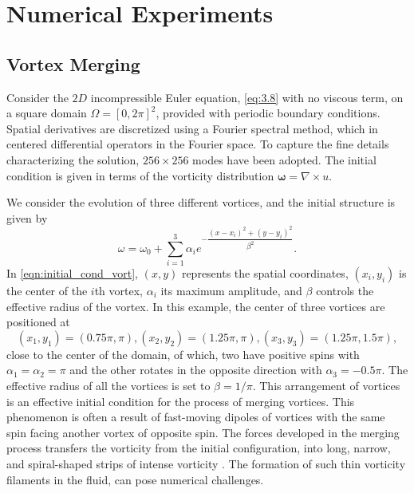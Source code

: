 

\section{Numerical Experiments} \label{sec:res}

\subsection{Vortex Merging}
Consider the $2D$ incompressible Euler equation, \eqref{eq:3.8} with no viscous term, on a square domain $\Omega = [0,2\pi]^2$, provided with periodic boundary conditions. Spatial derivatives are discretized using a Fourier spectral method, which in centered differential operators in the Fourier space. To capture the fine details characterizing the solution, $256\times 256$ modes have been adopted. The initial condition is given in terms of the vorticity distribution $\mathbf{\omega} = \nabla \times u$. 

We consider the evolution of three different vortices, and the initial structure is given by
\begin{equation}\label{eqn:initial_cond_vort}
\omega = \omega_0 + \sum_{i=1}^{3} \alpha_i e^{-\dfrac{\left(x-x_i\right)^{2}+\left(y-y_i\right)^{2}}{\beta^2}}.
\end{equation}
In \eqref{eqn:initial_cond_vort}, $(x,y)$ represents the spatial coordinates, $\left( x_i, y_i\right)$ is the center of the $i$th vortex, $\alpha_i$ its maximum amplitude, and $\beta$ controls the effective radius of the vortex. In this example, the center of three vortices are positioned at 
\begin{equation}
\left( x_1, y_1 \right) = \left(0.75\pi,\pi\right) , \left( x_2, y_2 \right) = \left(1.25\pi,\pi\right), \left( x_3, y_3 \right) = \left(1.25\pi,1.5\pi\right),
\end{equation}
close to the center of the domain, of which, two have positive spins with $\alpha_1 = \alpha_2 = \pi$ and the other rotates in the opposite direction with $\alpha_3 = -0.5\pi$. The effective radius of all the vortices is set to $\beta = 1 / \pi$. This arrangement of vortices is an effective initial condition for the process of merging vortices. This phenomenon is often a result of fast-moving dipoles of vortices with the same spin facing another vortex \cite{filaments_vort2} of opposite spin. The forces developed in the merging process transfers the vorticity from the initial configuration, into long, narrow, and spiral-shaped strips of intense vorticity \cite{filaments_vort}. The formation of such thin vorticity filaments in the fluid, can pose numerical challenges. 

